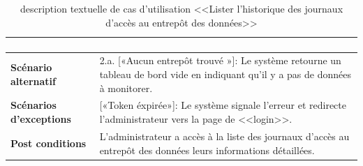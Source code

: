 \begin{enumerate}
\begin{table}[H]
\begin{tabular}{|p{3.5cm}|p{12cm}|}
\begin{enumerate}
                \end{enumerate}\\
                    \hline \textbf{Scénario alternatif} & 
                    2.a. \hspace{0.3cm} [«Aucun entrepôt trouvé »]: Le système retourne un tableau de bord vide en indiquant qu'il y a pas de données à monitorer.\\
            \hline  \textbf{Scénarios d'exceptions} & 
              [«Token éxpirée»]: Le système signale l'erreur et redirecte l'administrateur vers la page de <<login>>.\\
            \hline \textbf{Post conditions} & L'administrateur a accès à la liste des journaux d'accès au entrepôt des données leurs informations détaillées.\\
            \hline 
        \end{tabular}
        \caption{description textuelle de cas d'utilisation <<Lister l'historique des journaux d'accès au entrepôt des données>>}
        \end{table}
        

\end{enumerate}
